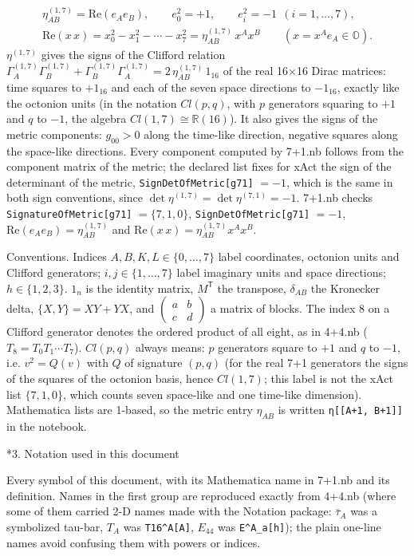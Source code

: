 \documentclass[10pt,a4paper]{article}
\makeatletter
\renewcommand\section{\@startsection{section}{1}{\z@}{-3.5ex \@plus -1ex \@minus -.2ex}{2.3ex \@plus.2ex}{\normalfont\Large\bfseries\raggedright}}
\makeatother
\begin{document}
\begin{gather*}
\eta^{(1,7)}_{AB}=\mathrm{Re}(e_Ae_B),\qquad e_0^2=+1,\qquad e_i^2=-1\ \ (i=1,\dots,7),\\ \mathrm{Re}(x\,x)=x_0^2-x_1^2-\cdots-x_7^2=\eta^{(1,7)}_{AB}\,x^Ax^B\qquad (x=x^Ae_A\in\mathbb O).
\end{gather*}
$\eta^{(1,7)}$ gives the signs of the Clifford relation $\Gamma^{(1,7)}_A\Gamma^{(1,7)}_B+\Gamma^{(1,7)}_B\Gamma^{(1,7)}_A=2\,\eta^{(1,7)}_{AB}\,1_{16}$ of the real 16×16 Dirac matrices: time squares to $+1_{16}$ and each of the seven space directions to $-1_{16}$, exactly like the octonion units (in the notation $Cl(p,q)$, with $p$ generators squaring to $+1$ and $q$ to $-1$, the algebra $Cl(1,7)\cong\mathbb R(16)$). It also gives the signs of the metric components: $g_{00}>0$ along the time-like direction, negative squares along the space-like directions. Every component computed by 7+1.nb follows from the component matrix of the metric; the declared list fixes for xAct the sign of the determinant of the metric, \texttt{SignDetOfMetric[g71]} $=-1$, which is the same in both sign conventions, since $\det \eta^{(1,7)}=\det \eta^{(7,1)}=-1$. 7+1.nb checks \texttt{SignatureOfMetric[g71]} $=\{7,1,0\}$, \texttt{SignDetOfMetric[g71]} $=-1$, $\mathrm{Re}(e_Ae_B)=\eta^{(1,7)}_{AB}$ and $\mathrm{Re}(x\,x)=\eta^{(1,7)}_{AB}x^Ax^B$.

Conventions. Indices $A,B,K,L\in\lbrace0,\dots,7\rbrace$ label coordinates, octonion units and Clifford generators; $i,j\in\lbrace1,\dots,7\rbrace$ label imaginary units and space directions; $h\in\lbrace1,2,3\rbrace$. $1_n$ is the identity matrix, $M^{\mathsf T}$ the transpose, $\delta_{AB}$ the Kronecker delta, $\lbrace X,Y\rbrace=XY+YX$, and $\left(\begin{smallmatrix}a&b\\c&d\end{smallmatrix}\right)$ a matrix of blocks. The index 8 on a Clifford generator denotes the ordered product of all eight, as in 4+4.nb ($T_8=T_0T_1\cdots T_7$). $Cl(p,q)$ always means: $p$ generators square to $+1$ and $q$ to $-1$, i.e. $v^2=Q(v)$ with $Q$ of signature $(p,q)$ (for the real 7+1 generators the signs of the squares of the octonion basis, hence $Cl(1,7)$; this label is not the xAct list $\{7,1,0\}$, which counts seven space-like and one time-like dimension). Mathematica lists are 1-based, so the metric entry $\eta_{AB}$ is written \texttt{η[[A+1, B+1]]} in the notebook.

\section*{3. Notation used in this document}
Every symbol of this document, with its Mathematica name in 7+1.nb and its definition. Names in the first group are reproduced exactly from 4+4.nb (where some of them carried 2-D names made with the Notation package: $\bar\tau_A$ was a symbolized tau-bar, $T_A$ was \texttt{T16\textasciicircum{}A[A]}, $E_{44}$ was \texttt{E\textasciicircum{}A\_\allowbreak{}a[h]}); the plain one-line names avoid confusing them with powers or indices.
\end{document}
